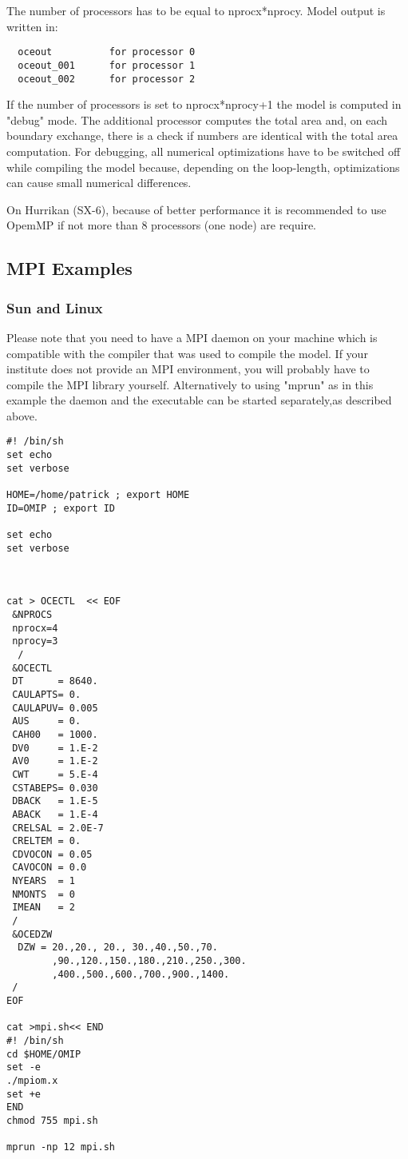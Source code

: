 The number of processors has to be equal to nprocx*nprocy.
Model output is written in:   
\begin{footnotesize}
\begin{verbatim}
  oceout          for processor 0
  oceout_001      for processor 1
  oceout_002      for processor 2
\end{verbatim}
\end{footnotesize}

If the number of processors is set to nprocx*nprocy+1 
the model is computed in "debug" mode. The additional processor
computes the total area and, on each boundary exchange, there is a 
check if numbers are identical with the total area computation.
For debugging, all numerical optimizations have to be 
switched off while compiling the model because, depending on the loop-length, 
optimizations can cause small numerical differences.

On Hurrikan (SX-6), because of better performance it is recommended to use OpemMP
if not more than 8 processors (one node) are require.

\subsection{MPI Examples}

\subsubsection{Sun and Linux}

Please note that you need to have a MPI daemon on your machine which
is compatible with the compiler that was used to compile the model.
If your institute does not provide an MPI environment, you will probably
have to compile the MPI library yourself.
Alternatively to using "mprun" as in this example the daemon
and the executable can be started separately,as described above.

\begin{footnotesize}
\begin{verbatim}
#! /bin/sh
set echo
set verbose

HOME=/home/patrick ; export HOME
ID=OMIP ; export ID

set echo
set verbose



cat > OCECTL  << EOF
 &NPROCS
 nprocx=4
 nprocy=3
  /
 &OCECTL
 DT      = 8640.
 CAULAPTS= 0.
 CAULAPUV= 0.005
 AUS     = 0.
 CAH00   = 1000.
 DV0     = 1.E-2
 AV0     = 1.E-2
 CWT     = 5.E-4
 CSTABEPS= 0.030
 DBACK   = 1.E-5
 ABACK   = 1.E-4
 CRELSAL = 2.0E-7
 CRELTEM = 0.
 CDVOCON = 0.05
 CAVOCON = 0.0
 NYEARS  = 1
 NMONTS  = 0
 IMEAN   = 2
 /
 &OCEDZW
  DZW = 20.,20., 20., 30.,40.,50.,70.
        ,90.,120.,150.,180.,210.,250.,300.
        ,400.,500.,600.,700.,900.,1400.
 /
EOF

cat >mpi.sh<< END
#! /bin/sh
cd $HOME/OMIP   
set -e
./mpiom.x
set +e
END
chmod 755 mpi.sh

mprun -np 12 mpi.sh

\end{verbatim}
\end{footnotesize}

